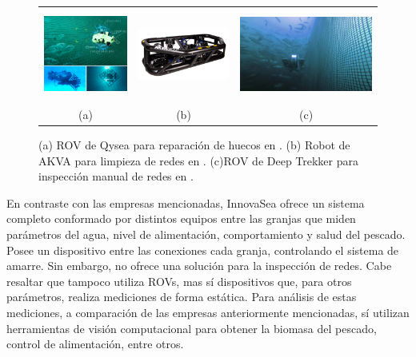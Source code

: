 \begin{figure} [!h]
    \begin{center}
    \begin{tabular}{ccc}
    \includegraphics[height=3cm]{images/Qysea_1} &
    \includegraphics[height=2cm]{images/AKVA_1} &
    \includegraphics[height=3cm]{images/Deep_1} \\
    (a) & (b) & (c)
    \end{tabular}
    \caption{\label{fig:empresas_manual}(a)  ROV de Qysea para reparación de huecos en \cite{Qysea}. (b) Robot de AKVA para limpieza de redes en \cite{AKVAgroup}. (c)ROV de Deep Trekker para inspección manual de redes en  \cite{DeepTrekker}.}
    \end{center}
\end{figure}


En contraste con las empresas mencionadas, InnovaSea \cite{InnovaSea} ofrece un sistema completo conformado por distintos equipos entre las granjas que miden parámetros del agua, nivel de alimentación, comportamiento y salud del pescado. Posee un dispositivo entre las conexiones cada granja, controlando el sistema de amarre. Sin embargo, no ofrece una solución para la inspección de redes. Cabe resaltar que tampoco utiliza ROVs, mas sí dispositivos que, para otros parámetros, realiza mediciones de forma estática. Para análisis de estas mediciones, a comparación de las empresas anteriormente mencionadas, sí utilizan herramientas de visión computacional para obtener la biomasa del pescado, control de alimentación, entre otros. 

